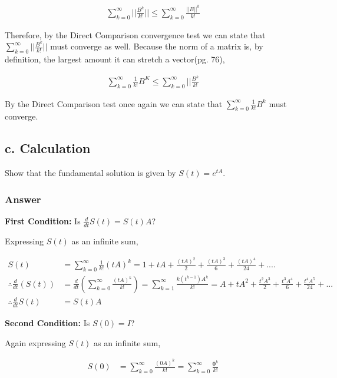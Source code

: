 \documentclass{article}
\newcommand{\n}{\newline}
\begin{document}
		\begin{align*}
			\sum_{k=0}^{\infty}||\frac{B^k}{k!}||\leq\sum_{k=0}^{\infty}\frac{||B||^k}{k!}
		\end{align*} 
		
		Therefore, by the Direct Comparison convergence test\cite{ComTest} we can state that $\sum_{k=0}^{\infty}||\frac{B^k}{k!}||$ must converge as well.  Because the norm of a matrix is, by definition, the largest amount it can stretch a vector\cite{BG}(pg. 76), 
		
		\begin{align*}
			\sum_{k=0}^{\infty}\frac{1}{k!}B^{K}\leq\sum_{k=0}^{\infty}||\frac{B^k}{k!}
		\end{align*}
		
		By the Direct Comparison test once again we can state that $\sum_{k=0}^{\infty}\frac{1}{k!}B^{k}$ must converge.
		
		\subsection{c. Calculation}
		Show that the fundamental solution is given by $S(t)=e^{tA}$.
		\subsubsection{Answer}
		
		\textbf{First Condition:} Is $\frac{d}{dt}S(t)=S(t)A$?\n
		
		Expressing $S(t)$ as an infinite sum,
		
		\begin{align*}
			S(t)&=\sum_{k=0}^{\infty}\frac{1}{k!}(tA)^{k}=1+tA+\frac{(tA)^2}{2}+\frac{(tA)^3}{6}+\frac{(tA)^4}{24}+.... \\
			\therefore \frac{d}{dt}(S(t))&=\frac{d}{dt}(\sum_{k=0}^{\infty}\frac{(tA)^{k}}{k!})=\sum_{k=1}^{\infty}\frac{k(t^{k-1})A^k}{k!}=A+tA^2+\frac{t^2A^3}{2}+\frac{t^3A^4}{6}+\frac{t^4A^5}{24}+...\\
			\therefore \frac{d}{dt}S(t)&=S(t)A
		\end{align*}
		
		\textbf{Second Condition:} Is $S(0)=I$?\n
		
		Again expressing $S(t)$ as an infinite sum,
		
		\begin{align*}
			S(0)&=\sum_{k=0}^{\infty}\frac{(0A)^k}{k!}=\sum_{k=0}^{\infty}\frac{\mathbf{0}^k}{k!}
		\end{align*}
		
\end{document}
